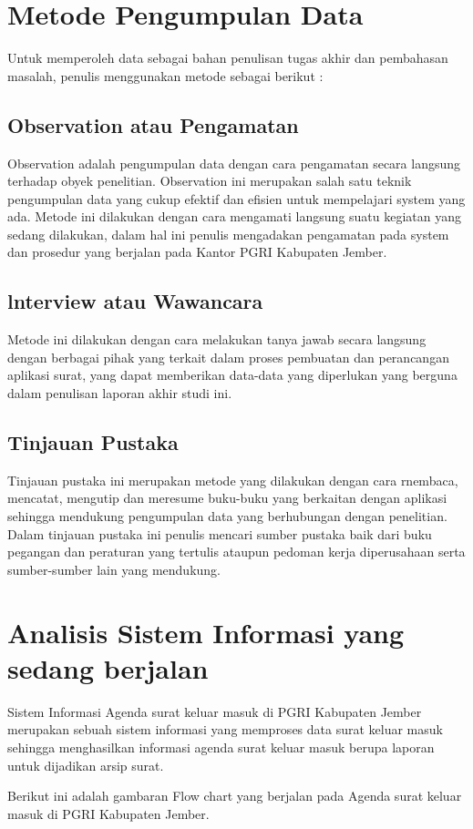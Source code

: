 \documentclass{jtetiproposalskripsi}
\begin{document}
\section{Metode Pengumpulan Data}
Untuk memperoleh data sebagai bahan penulisan tugas akhir dan pembahasan masalah, penulis menggunakan metode sebagai berikut :
\subsection{Observation atau Pengamatan}
Observation adalah pengumpulan data dengan cara pengamatan secara langsung terhadap obyek penelitian. Observation ini merupakan salah satu teknik pengumpulan data yang cukup efektif dan efisien untuk mempelajari system yang ada. Metode ini dilakukan dengan cara mengamati langsung suatu kegiatan yang sedang dilakukan, dalam hal ini penulis mengadakan pengamatan pada system dan prosedur yang berjalan pada Kantor PGRI Kabupaten Jember.
\subsection{lnterview atau Wawancara}
Metode ini dilakukan dengan cara melakukan tanya jawab secara langsung dengan berbagai pihak yang terkait dalam proses pembuatan dan perancangan aplikasi surat, yang dapat memberikan data-data yang diperlukan yang berguna dalam penulisan laporan akhir studi ini.
\subsection{Tinjauan Pustaka}
Tinjauan pustaka ini merupakan metode yang dilakukan dengan cara rnembaca, mencatat, mengutip dan meresume buku-buku yang berkaitan dengan aplikasi sehingga mendukung pengumpulan data yang berhubungan dengan penelitian. Dalam tinjauan pustaka ini penulis mencari sumber pustaka baik dari buku pegangan dan peraturan yang tertulis ataupun pedoman kerja diperusahaan serta sumber-sumber lain yang mendukung.

\section{Analisis Sistem Informasi yang sedang berjalan}
Sistem Informasi Agenda surat keluar masuk di PGRI Kabupaten Jember merupakan sebuah sistem informasi yang memproses data surat keluar masuk sehingga menghasilkan informasi agenda surat keluar masuk berupa laporan untuk dijadikan arsip surat.

Berikut ini adalah gambaran Flow chart yang berjalan pada Agenda surat keluar masuk di PGRI Kabupaten Jember.
\end{document}
